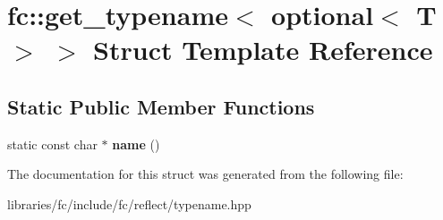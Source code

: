 \hypertarget{structfc_1_1get__typename_3_01optional_3_01_t_01_4_01_4}{}\section{fc\+:\+:get\+\_\+typename$<$ optional$<$ T $>$ $>$ Struct Template Reference}
\label{structfc_1_1get__typename_3_01optional_3_01_t_01_4_01_4}
\subsection*{Static Public Member Functions}
\begin{DoxyCompactItemize}
\item 
\mbox{\label{structfc_1_1get__typename_3_01optional_3_01_t_01_4_01_4_a8daf421f3fe8c3be6b19bec51321f432}} 
static const char $\ast$ {\bfseries name} ()
\end{DoxyCompactItemize}


The documentation for this struct was generated from the following file\+:\begin{DoxyCompactItemize}
\item 
libraries/fc/include/fc/reflect/typename.\+hpp\end{DoxyCompactItemize}
